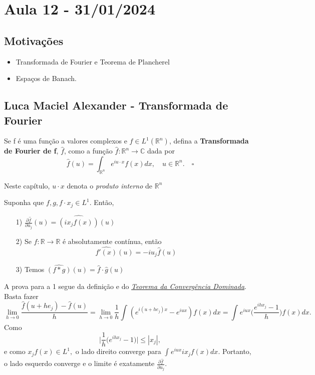 \documentclass[measure_theory.tex]{subfiles}
\begin{document}
\section{Aula 12 - 31/01/2024}
\subsection{Motivações}
\begin{itemize}
	\item Transformada de Fourier e Teorema de Plancherel
	\item Espaços de Banach.
\end{itemize}
\subsection{Luca Maciel Alexander - Transformada de Fourier}
\begin{def*}
	Se f é uma função a valores complexos e \(f\in L^{1}(\mathbb{R}^{n})\), defina a \textbf{Transformada de Fourier de f}, \(\hat{f}\), como a função \(\hat{f}:\mathbb{R}^{n}\rightarrow \mathbb{C}\) dada por
	\[
		\hat{f}(u) = \int_{\mathbb{R}^{n}}^{}e^{iu \cdot x}f(x)dx,\quad u\in \mathbb{R}^{n}.\quad \square
	\]
\end{def*}
Neste capítulo, \(u \cdot x\) denota o \textit{produto interno} de \(\mathbb{R}^{n}\)
\begin{prop*}
	Suponha que \(f, g, f \cdot x_{j}\in L^{1}.\) Então,
	\begin{itemize}
		\item[1)] \(\frac{\partial \hat{f}}{\partial u_{j}}(u) = \widehat{(ix_{j}f(x))}(u)\)
		\item[2)] Se \(f:\mathbb{R}\rightarrow \mathbb{R}\) é absolutamente contínua, então
		      \[
			      \hat{f'(x)}(u) = -iu_{j}\hat{f}(u)
		      \]
		\item[3)] Temos \(\widehat{(f*g)}(u) = \hat{f}\cdot \hat{g}(u)\)
	\end{itemize}
\end{prop*}
\begin{proof*}
	A prova para a 1 segue da definição e do \hyperlink{dominated_convergence}{\textit{Teorema da Convergência Dominada}}. Basta fazer
	\[
		\lim_{h\to 0}\frac{\hat{f}(u+he_{j}) - \hat{f}(u)}{h} = \lim_{h\to 0} \frac{1}{h}\int_{}^{}(e^{i(u+he_{j})x}-e^{iux})f(x)dx = \int_{}^{}e^{iux}\biggl(\frac{e^{ihx_{j}} -1}{h}\biggr)f(x)dx.
	\]
	Como
	\[
		\biggl\vert \frac{1}{h}\biggl(e^{ihx_{j}}-1\biggr) \biggr\vert\leq |x_{j}|,
	\]
	e como \(x_{j}f(x)\in L^{1},\) o lado direito converge para \(\int_{}^{}e^{iux}ix_{j}f(x)dx\). Portanto, o lado esquerdo converge e o limite é exatamente \(\frac{\partial \hat{f}}{\partial u_{j}}\).
\end{proof*}
\end{document}
